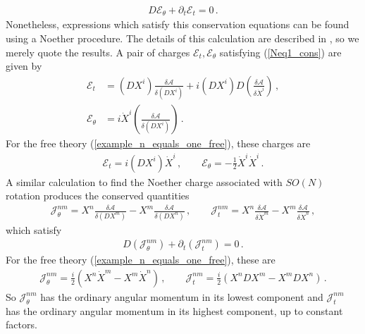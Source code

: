 \documentclass[12pt]{article}
\numberwithin{equation}{section}
\begin{document}
%
\begin{align}\label{Neq1_cons}
    D \mathcal{E}_\theta + \partial_t \mathcal{E}_t = 0 \, .
\end{align}
%
Nonetheless, expressions which satisfy this conservation equations can be found using a Noether procedure. The details of this calculation are described in \cite{Ebert:2022xfh}, so we merely quote the results. A pair of charges $\mathcal{E}_t, \mathcal{E}_\theta$ satisfying (\ref{Neq1_cons}) are given by
%
\begin{align}
    \mathcal{E}_t &= ( D X^i ) \frac{\delta \mathcal{A}}{\delta ( D X^i )} + i ( D X^i ) D \left( \frac{\delta \mathcal{A}}{\delta \dot{X}^i} \right) \, , \nonumber \\
    \mathcal{E}_\theta &= i  \dot{X}^i \left( \frac{\delta \mathcal{A}}{\delta ( D X^i ) } \right) \, .
\end{align}
%
For the free theory (\ref{example_n_equals_one_free}), these charges are
%
\begin{align}
    \mathcal{E}_t = i \left( D X^i \right) \dot{X}^i \, , \qquad \mathcal{E}_\theta = - \frac{1}{2} \dot{X}^i \dot{X}^i \, .
\end{align}
%
A similar calculation to find the Noether charge associated with $SO(N)$ rotation produces the conserved quantities
%
\begin{align}
    \mathcal{J}_\theta^{nm} = X^n \frac{\delta \mathcal{A}}{\delta ( DX^m )} -  X^m \frac{\delta \mathcal{A}}{\delta ( DX^n )} \, , \qquad \mathcal{J}_t^{nm} = X^n \frac{\delta \mathcal{A}}{\delta \dot{X}^m} - X^m \frac{\delta \mathcal{A}}{\delta \dot{X}^n} \, , 
\end{align}
%
which satisfy
%
\begin{align}
    D \left( \mathcal{J}_\theta^{nm} \right) + \partial_t \left( \mathcal{J}_t^{nm} \right) = 0 \, .
\end{align}
%
For the free theory (\ref{example_n_equals_one_free}), these are
%
\begin{align}
    \mathcal{J}_\theta^{nm} = \frac{i}{2} \left( X^n \dot{X}^m -  X^m \dot{X}^n \right) \, , \qquad \mathcal{J}_t^{nm} = \frac{i}{2} \left(  X^n D X^m - X^m D X^n \right) \, .
\end{align}
%
So $\mathcal{J}_\theta^{nm}$ has the ordinary angular momentum in its lowest component and $\mathcal{J}_t^{nm}$ has the ordinary angular momentum in its highest component, up to constant factors.
\end{document}
